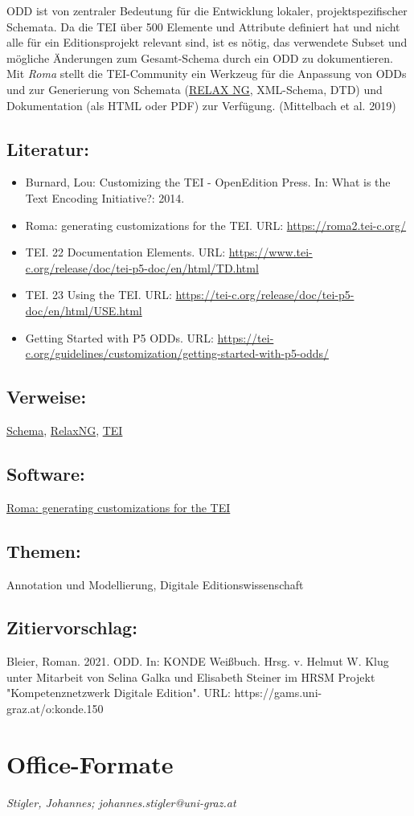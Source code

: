 \documentclass{article}
\begin{document}
        ODD ist von zentraler Bedeutung für die Entwicklung lokaler, projektspezifischer
                  Schemata. Da die TEI über 500 Elemente und Attribute definiert hat und nicht alle
                  für ein Editionsprojekt relevant sind, ist es nötig, das verwendete Subset und
                  mögliche Änderungen zum Gesamt-Schema durch ein ODD zu dokumentieren. Mit \emph{Roma} stellt die TEI-Community ein Werkzeug für die Anpassung
                  von ODDs und zur Generierung von Schemata (\href{http://gams.uni-graz.at/o:konde.163}{RELAX NG}, XML-Schema, DTD) und Dokumentation (als
                  HTML oder PDF) zur Verfügung. (Mittelbach et al. 2019)\\
            
        \subsection*{Literatur:}\begin{itemize}\item Burnard, Lou: Customizing the TEI - OpenEdition Press. In: What is the Text Encoding Initiative?: 2014.\item Roma: generating customizations for the TEI. URL: \url{https://roma2.tei-c.org/}\item TEI. 22 Documentation Elements. URL: \url{https://www.tei-c.org/release/doc/tei-p5-doc/en/html/TD.html}\item TEI. 23 Using the TEI. URL: \url{https://tei-c.org/release/doc/tei-p5-doc/en/html/USE.html}\item Getting Started with P5 ODDs. URL: \url{https://tei-c.org/guidelines/customization/getting-started-with-p5-odds/}\end{itemize}\subsection*{Verweise:}\href{https://gams.uni-graz.at/o:konde.166}{Schema}, \href{https://gams.uni-graz.at/o:konde.163}{RelaxNG}, \href{https://gams.uni-graz.at/o:konde.178}{TEI}\subsection*{Software:}\href{https://roma.tei-c.org}{Roma: generating
                           customizations for the TEI}\subsection*{Themen:}Annotation und Modellierung, Digitale Editionswissenschaft\subsection*{Zitiervorschlag:}Bleier, Roman. 2021. ODD. In: KONDE Weißbuch. Hrsg. v. Helmut W. Klug unter Mitarbeit von Selina Galka und Elisabeth Steiner im HRSM Projekt "Kompetenznetzwerk Digitale Edition". URL: https://gams.uni-graz.at/o:konde.150\newpage\section*{Office-Formate} \emph{Stigler, Johannes; johannes.stigler@uni-graz.at}\\
        
\end{document}
